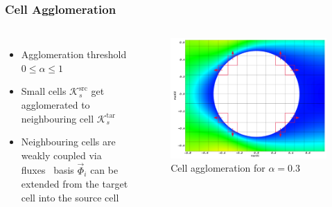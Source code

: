 	\begin{frame}
		\frametitle{Cell Agglomeration}

		\begin{columns}[t]
			\column[]{5cm}
			\vspace{-0.5cm}
			\begin{itemize}
				\item Agglomeration threshold  $0 \leq \alpha \leq 1$
				\item Small cells $\mathcal{K}_s^\text{src}$ get agglomerated to neighbouring cell $\mathcal{K}_s^\text{tar}$
				\item Neighbouring cells are weakly coupled via fluxes \newline \MVRightArrow \, basis $\vec{\Phi}_i$ can be extended from the target cell into the source cell
			\end{itemize}
			\column[]{7cm}
			\begin{figure}[htbp]
				\vspace{-1cm}
				\includegraphics[width=\textwidth]{img/agglom.PNG}
				\caption{Cell agglomeration for $\alpha = 0.3$}
			\end{figure} 
		\end{columns}
	\end{frame}